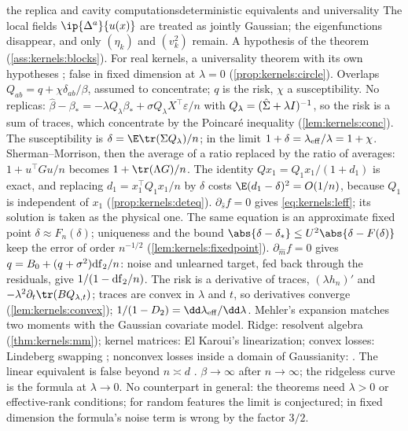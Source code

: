 \begin{refsection}
\begin{stone}{the replica and cavity computations}{deterministic equivalents and universality}
{The local fields $\ip{\Delta^a}{u(x)}$ are treated as jointly Gaussian; the eigenfunctions disappear, and only $(\eta_k)$ and $(v_k^2)$ remain.}
{A hypothesis of the theorem (\cref{ass:kernels:blocks}). For real kernels, a universality theorem with its own hypotheses \parencite{XiaoEtAl2023,MisiakiewiczSaeed2024}; false in fixed dimension at $\lambda=0$ (\cref{prop:kernels:circle}).}
{Overlaps $Q_{ab}=q+\chi\delta_{ab}/\beta$, assumed to concentrate; $q$ is the risk, $\chi$ a susceptibility.}
{No replicas: $\hat\beta-\beta_*=-\lambda Q_\lambda\beta_*+\sigma Q_\lambda X^\top\varepsilon/n$ with $Q_\lambda=(\hat\Sigma+\lambda I)^{-1}$, so the risk is a sum of traces, which concentrate by the Poincaré inequality (\cref{lem:kernels:conc}). The susceptibility is $\delta=\E\tr(\Sigma Q_\lambda)/n$; in the limit $1+\delta=\lambda_{\mathrm{eff}}/\lambda=1+\chi$.}
{Sherman--Morrison, then the average of a ratio replaced by the ratio of averages: $1+u^\top Gu/n$ becomes $1+\tr(\Lambda G)/n$.}
{The  identity $Qx_1=Q_1x_1/(1+d_1)$ is exact, and replacing $d_1=x_1^\top Q_1x_1/n$ by $\delta$ costs $\E(d_1-\delta)^2=O(1/n)$, because $Q_1$ is independent of $x_1$ (\cref{prop:kernels:deteq}).}
{$\partial_{\hat s}f=0$ gives \eqref{eq:kernels:leff}; its solution is taken as the physical one.}
{The same equation is an approximate fixed point $\delta\approx F_n(\delta)$; uniqueness and the bound $\abs{\delta-\delta_*}\le U^2\abs{\delta-F(\delta)}$ keep the error of order $n^{-1/2}$ (\cref{lem:kernels:fixedpoint}).}
{$\partial_{\hat m}f=0$ gives $q=B_0+(q+\sigma^2)\mathrm{df}_2/n$: noise and unlearned target, fed back through the residuals, give $1/(1-\mathrm{df}_2/n)$.}
{The risk is a derivative of traces, $(\lambda h_n)'$ and $-\lambda^2\partial_t\tr(BQ_{\lambda,t})$; traces are convex in $\lambda$ and $t$, so derivatives converge (\cref{lem:kernels:convex}); $1/(1-D_2)=\dd\kernelsleff/\dd\lambda$.}
{Mehler's expansion matches two moments with the Gaussian covariate model.}
{Ridge: resolvent algebra (\cref{thm:kernels:mm}); kernel matrices: El Karoui's linearization; convex losses: Lindeberg swapping \parencite{HuLu2023}; nonconvex losses inside a domain of Gaussianity: \textcite{MontanariSaeed2022}. The linear equivalent is false beyond $n\asymp d$ \parencite{GhorbaniEtAl2021}.}
{$\beta\to\infty$ after $n\to\infty$; the ridgeless curve is the formula at $\lambda\to0$.}
{No counterpart in general: the theorems need $\lambda>0$ or effective-rank conditions; for random features the limit is conjectured; in fixed dimension the formula's noise term is wrong by the factor $3/2$.}
\end{stone}


\end{refsection}
